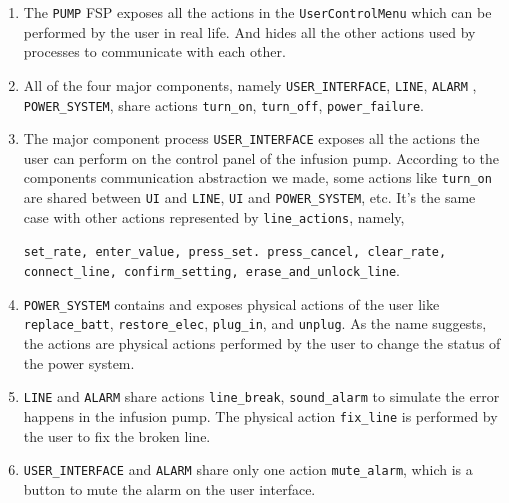 \documentclass[titlepage]{article}
\begin{document}
  
        \begin{enumerate}
        \item The \texttt{PUMP} FSP exposes all the actions in the \texttt{UserControlMenu} which can be performed by the user in real life. And hides all the other actions used by processes to communicate with each other.
        
        \item All of the four major components, namely \texttt{USER\_INTERFACE}, \texttt{LINE}, \texttt{ALARM} , \texttt{POWER\_SYSTEM}, share actions \texttt{turn\_on}, \texttt{turn\_off}, \texttt{power\_failure}.
        
        \item The major component process \texttt{USER\_INTERFACE} exposes all the actions the user can perform on the control panel of the infusion pump. According to the components communication abstraction we made, some actions like \texttt{turn\_on} are shared between \texttt{UI} and \texttt{LINE}, \texttt{UI} and \texttt{POWER\_SYSTEM}, etc. It's the same case with other actions represented by \texttt{line\_actions}, namely,
        
        \texttt{set\_rate, enter\_value, press\_set. press\_cancel, clear\_rate, connect\_line, confirm\_setting, erase\_and\_unlock\_line}.
        
        \item \texttt{POWER\_SYSTEM} contains and exposes physical actions of the user like \texttt{replace\_batt}, \texttt{restore\_elec}, \texttt{plug\_in}, and \texttt{unplug}. As the name suggests, the actions are physical actions performed by the user to change the status of the power system.
        
        \item \texttt{LINE} and \texttt{ALARM} share actions \texttt{line\_break}, \texttt{sound\_alarm} to simulate the error happens in the infusion pump. The physical action \texttt{fix\_line} is performed by the user to fix the broken line.
        
        \item \texttt{USER\_INTERFACE} and \texttt{ALARM} share only one action \texttt{mute\_alarm}, which is a button to mute the alarm on the user interface.
    \end{enumerate}
\end{document}
